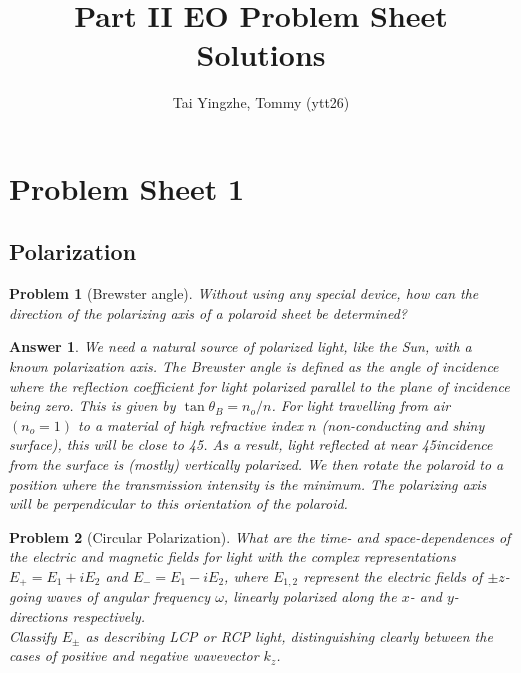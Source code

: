 \documentclass[a4paper]{article}
\title{\textbf{Part II EO Problem Sheet Solutions}}
\author{Tai Yingzhe, Tommy (ytt26)}
\date{}
\newtheorem{ans}{Answer}[section]
\theoremstyle{new}
\newtheorem{qns}{Problem}[section]
\begin{document}
\maketitle
\tableofcontents
\newpage
\section{Problem Sheet 1}
\subsection*{Polarization}
\begin{qns}[Brewster angle]
Without using any special device, how can the direction of the polarizing axis of a polaroid sheet be determined?
\end{qns}
\begin{ans}
We need a natural source of polarized light, like the Sun, with a known polarization axis. The Brewster angle is defined as the angle of incidence where the reflection coefficient for light polarized parallel to the plane of incidence being zero. This is given by $\tan\theta_B=n_o/n$. For light travelling from air $(n_o=1)$ to a material of high refractive index $n$ (non-conducting and shiny surface), this will be close to 45\degree. As a result, light reflected at near 45\degree incidence from the surface is (mostly) vertically polarized. We then rotate the polaroid to a position where the transmission intensity is the minimum. The polarizing axis will be perpendicular to this orientation of the polaroid.
\end{ans}
\begin{qns}[Circular Polarization]
What are the time- and space-dependences of the electric and magnetic fields for light with the complex representations $E_+ = E_1 + iE_2$ and $E_-= E_1 − iE_2$, where $E_{1,2}$ represent the electric fields of $\pm z$-going waves of angular frequency $\omega$, linearly polarized along the $x$- and $y$-directions respectively.\\[5pt]
Classify $E_\pm$ as describing LCP or RCP light, distinguishing clearly between the cases of positive and negative wavevector $k_z$.
\end{qns}
\end{document}
